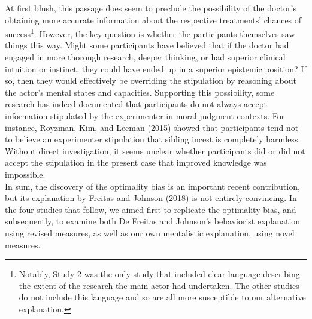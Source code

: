 \documentclass[
  man,floatsintext]{apa6}
\begin{document}
At first blush, this passage does seem to preclude the possibility of the doctor's obtaining more accurate information about the respective treatments' chances of success\footnote{Notably, Study 2 was the only study that included clear language describing the extent of the research the main actor had undertaken. The other studies do not include this language and so are all more susceptible to our alternative explanation.}. However, the key question is whether the participants themselves saw things this way. Might some participants have believed that if the doctor had engaged in more thorough research, deeper thinking, or had superior clinical intuition or instinct, they could have ended up in a superior epistemic position? If so, then they would effectively be overriding the stipulation by reasoning about the actor's mental states and capacities. Supporting this possibility, some research has indeed documented that participants do not always accept information stipulated by the experimenter in moral judgment contexts. For instance, Royzman, Kim, and Leeman (2015) showed that participants tend not to believe an experimenter stipulation that sibling incest is completely harmless. Without direct investigation, it seems unclear whether participants did or did not accept the stipulation in the present case that improved knowledge was impossible.\\
In sum, the discovery of the optimality bias is an important recent contribution, but its explanation by Freitas and Johnson (2018) is not entirely convincing. In the four studies that follow, we aimed first to replicate the optimality bias, and subsequently, to examine both De Freitas and Johnson's behaviorist explanation using revised measures, as well as our own mentalistic explanation, using novel measures.\\
\end{document}
